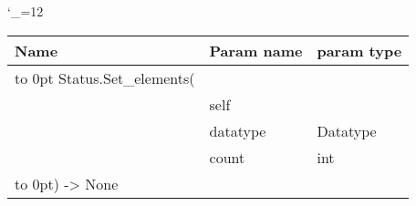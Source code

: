 \begingroup \catcode`\_=12 \tt
\begin{tabular}{lll}
\toprule
\textrm{Name}&\textrm{Param name}&\textrm{param type}\\
\midrule
\hbox to 0pt {Status.Set_elements(\hss}\\
& self\\
& datatype & Datatype\\
& count & int\\
\hbox to 0pt{) -> None\hss}\\
\bottomrule
\end{tabular}
\endgroup
